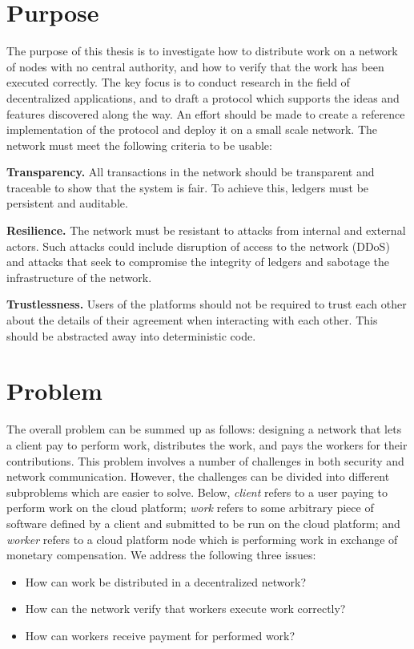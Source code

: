 \section{Purpose}
\label{sec:intro:purpose}
The purpose of this thesis is to investigate how to distribute work on a network of nodes with no central authority, and how to verify that the work has been executed correctly. The key focus is to conduct research in the field of decentralized applications, and to draft a protocol which supports the ideas and features discovered along the way. An effort should be made to create a reference implementation of the protocol and deploy it on a small scale network. The network must meet the following criteria to be usable:

\textbf{Transparency.} All transactions in the network should be transparent and traceable to show that the system is fair. To achieve this, ledgers must be persistent and auditable.

\textbf{Resilience.} The network must be resistant to attacks from internal and external actors. Such attacks could include disruption of access to the network (DDoS) and attacks that seek to compromise the integrity of ledgers and sabotage the infrastructure of the network.

\textbf{Trustlessness.} Users of the platforms should not be required to trust each other about the details of their agreement when interacting with each other. This should be abstracted away into deterministic code.

\section{Problem}
\label{sec:intro:problem}
The overall problem can be summed up as follows: designing a network that lets a client pay to perform work, distributes the work, and pays the workers for their contributions. This problem involves a number of challenges in both security and network communication. However, the challenges can be divided into different subproblems which are easier to solve. Below, \emph{client} refers to a user paying to perform work on the cloud platform; \emph{work} refers to some arbitrary piece of software defined by a client and submitted to be run on the cloud platform; and \emph{worker} refers to a cloud platform node which is performing work in exchange of monetary compensation.
We address the following three issues:
\begin{itemize}
\item How can work be distributed in a decentralized network?
\item How can the network verify that workers execute work correctly?
\item How can workers receive payment for performed work?
\end{itemize}

